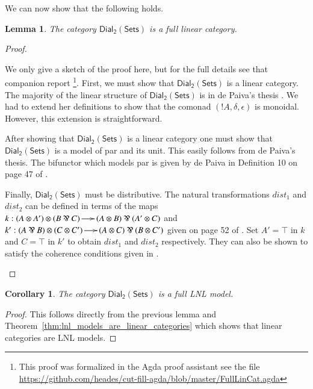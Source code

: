 \documentclass{elsarticle}
\newcommand{\dial}[0]{\mathsf{Dial_2}(\mathsf{Sets})}
\newtheorem{lemma}[theorem]{Lemma}
\newtheorem{corollary}[theorem]{Corollary}
\begin{document}
We can now show that the following holds.
\begin{lemma}
  \label{lemma:ddial_is_a_linear_category}
  The category $\dial$ is a full linear category.
\end{lemma}
\begin{proof}
  \begin{paper}
    We only give a sketch of the proof here, but for the full details
    see that companion report \cite{Eades:2015}\footnote{This proof
      was formalized in the Agda proof assistant see the file
      \url{https://github.com/heades/cut-fill-agda/blob/master/FullLinCat.agda}}. First,
    we must show that $\dial$ is a linear category.  The majority of
    the linear structure of $\dial$ is in de Paiva's thesis
    \cite{dePaiva:1988}.  We had to extend her definitions to show
    that the comonad $(!A,\delta,\epsilon)$ is monoidal. However, this extension
    is straightforward.

    After showing that $\dial$ is a linear category one must show that
    $\dial$ is a model of par and its unit.  This easily follows from
    de Paiva's thesis.  The bifunctor which models par is given by de
    Paiva in Definition 10 on page 47 of \cite{dePaiva:1988}.

    Finally, $\dial$ must be distributive.  The natural
    transformations $dist_1$ and $dist_2$ can be defined in terms of
    the maps $k : (A \otimes A') \otimes (B \parr C) \to (A \otimes B)
    \parr (A' \otimes C)$ and $k' : (A \parr B) \otimes (C \otimes C')
    \to (A \otimes C) \parr (B \otimes C')$ given on page 52 of
    \cite{dePaiva:1988}.  Set $A' = \top$ in $k$ and $C = \top$ in
    $k'$ to obtain $dist_1$ and $dist_2$ respectively.  They can also
    be shown to satisfy the coherence conditions given in
    \cite{Cockett:1997}.
  \end{paper}
  
\end{proof}

\begin{corollary}
  \label{corollary:dial-FLNL}
  The category $\dial$ is a full LNL model.
\end{corollary}
\begin{proof}
  This follows directly from the previous lemma and
  Theorem~\ref{thm:lnl_models_are_linear_categories} which shows that
  linear categories are LNL models.
\end{proof}
\end{document}
